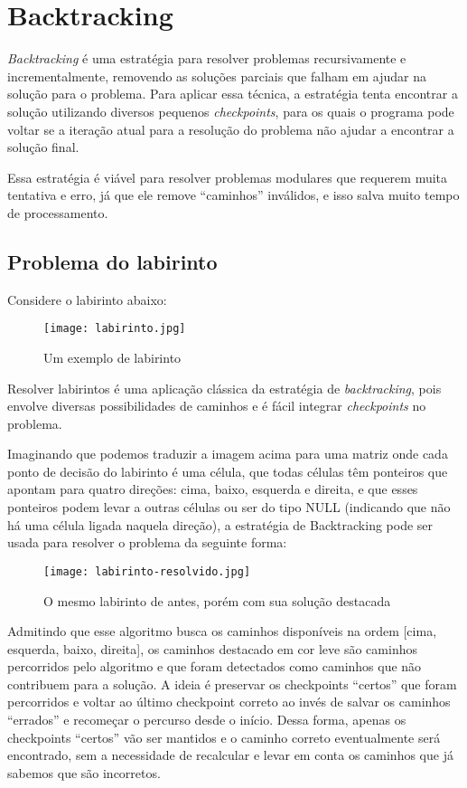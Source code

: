 \section{Backtracking} \label{sec:backtracking}

\emph{Backtracking} é uma estratégia para resolver problemas recursivamente e incrementalmente,
removendo as soluções parciais que falham em ajudar na solução para o problema. Para aplicar
essa técnica, a estratégia tenta encontrar a solução utilizando diversos pequenos \emph{checkpoints},
para os quais o programa pode voltar se a iteração atual para a resolução do problema não ajudar a
encontrar a solução final.

Essa estratégia é viável para resolver problemas modulares que requerem muita tentativa e erro, 
já que ele remove “caminhos” inválidos, e isso salva muito tempo de processamento.

\subsection{Problema do labirinto}

Considere o labirinto abaixo:

\begin{figure}[ht]
  \centering
  \texttt{[image: labirinto.jpg]}
  \caption{Um exemplo de labirinto}
  \label{fig:labirinto}
\end{figure}

Resolver labirintos é uma aplicação clássica da estratégia de \emph{backtracking},
pois envolve diversas possibilidades de caminhos e é fácil integrar \emph{checkpoints} no problema.

Imaginando que podemos traduzir a imagem acima para uma matriz onde cada ponto de 
decisão do labirinto é uma célula, que todas células têm ponteiros que apontam para 
quatro direções: cima, baixo, esquerda e direita, e que esses ponteiros podem levar 
a outras células ou ser do tipo NULL (indicando que não há uma célula ligada naquela direção),
a estratégia de Backtracking pode ser usada para resolver o problema da seguinte forma:

\begin{figure}[ht]
  \centering
  \texttt{[image: labirinto-resolvido.jpg]}
  \caption{O mesmo labirinto de antes, porém com sua solução destacada}
  \label{fig:labirinto-resolvido}
\end{figure}

Admitindo que esse algoritmo busca os caminhos disponíveis na ordem [cima, esquerda, baixo, direita],
os caminhos destacado em cor leve são caminhos percorridos pelo algoritmo e que foram detectados como caminhos
que não contribuem para a solução. A ideia é preservar os checkpoints “certos” que foram percorridos
e voltar ao último checkpoint correto ao invés de salvar os caminhos “errados” e recomeçar o percurso
desde o início. Dessa forma, apenas os checkpoints “certos” vão ser mantidos e o caminho correto
eventualmente será encontrado, sem a necessidade de recalcular e levar em conta os caminhos que 
já sabemos que são incorretos.

